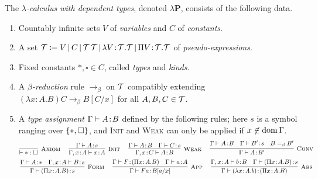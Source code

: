 \documentclass[reqno]{amsart}
\begin{document}
    \begin{definition}
        The \textit{$\lambda$-calculus with dependent types}, denoted $\lambda\mathbf{P}$, consists of the following data.
        \begin{enumerate}
            \item Countably infinite sets $V$ of \textit{variables} and $C$ of \textit{constants}.
            \item A set $\mathcal{T}\coloneqq V\,|\,C\,|\,\mathcal{T}\,\mathcal{T}\,|\,\lambda V\!:\!\mathcal{T}.\mathcal{T}\,|\,\Pi V\!:\!\mathcal{T}.\mathcal{T}$ of \textit{pseudo-expressions}.
            \item Fixed constants $\ast,\square\in C$, called \textit{types} and \textit{kinds}.
            \item A \textit{$\beta$-reduction} rule $\rightarrow_\beta$ on $\mathcal{T}$ compatibly extending $(\lambda x\!:\!A.B)C\rightarrow_\beta B[C/x]$ for all $A,B,C\in\mathcal{T}$.
            \item A \textit{type assignment} $\Gamma\vdash A\!:\!B$ defined by the following rules; here $s$ is a symbol ranging over $\left\{\ast,\square\right\}$, and \textsc{Init} and \textsc{Weak} can only be applied if $x\not\in\operatorname{dom}\Gamma$.
                {\small\begin{equation*}
                    \begin{gathered}
                        \infer[\mathsc{Axiom}]{\proves\ast:\square}{}\ \ \ \ 
                        \infer[\mathsc{Init}]{\Gamma,x\!:\!A\proves x\!:\! A}{
                            \Gamma\proves A\!:\!s
                        }\ \ \ \ 
                        \infer[\mathsc{Weak}]{\Gamma,x\!:\!C\proves A\!:\! B}{
                            \Gamma\proves A\!:\!B &
                            \Gamma\proves C\!:\!s
                        }\ \ \ \ 
                        \infer[\mathsc{Conv}]{\Gamma\proves A\!:\!B'}{
                            \Gamma\proves A\!:\!B &
                            \Gamma\proves B'\!:\!s &
                            B=_\beta B'
                        } \\
                        \infer[\mathsc{Form}]{\Gamma\proves(\Pi x\!:\!A.B)\!:\!s}{
                            \Gamma\proves A\!:\!\ast &
                            \Gamma,x\!:\!A\proves B\!:\!s
                        }\ \ \ \ 
                        \infer[\mathsc{App}]{\Gamma\proves Fa\!:\!B[a/x]}{
                            \Gamma\proves F\!:\!(\Pi x\!:\!A.B) &
                            \Gamma\proves a\!:\!A
                        }\ \ \ \ 
                        \infer[\mathsc{Abs}]{\Gamma\proves(\lambda x\!:\!A.b)\!:\!(\Pi x\!:\!A.B)}{
                            \Gamma,x\!:\!A\proves b\!:\!B &
                            \Gamma\proves(\Pi x\!:\!A.B)\!:\!s
                        }
                    \end{gathered}
                \end{equation*}}
        \end{enumerate}
    \end{definition}
\end{document}
